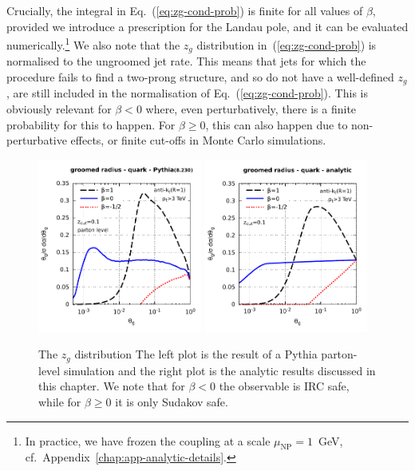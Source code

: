 %
Crucially, the integral in Eq.~(\ref{eq:zg-cond-prob}) is finite for
all values of $\beta$, provided we introduce a prescription for the
Landau pole, and it can be evaluated numerically.\footnote{In
  practice, we have frozen the coupling at a scale
  $\mu_\text{NP}=1$~GeV, cf.\
  Appendix~\ref{chap:app-analytic-details}.}
%
We also note that the $z_g$ distribution in~(\ref{eq:zg-cond-prob}) is
normalised to the ungroomed jet rate. This means that jets for which
the \SD procedure fails to find a two-prong structure, and so do not
have a well-defined $z_g$, are still included in the normalisation of
Eq.~(\ref{eq:zg-cond-prob}). This is obviously relevant for $\beta<0$
where, even perturbatively, there is a finite probability for this to
happen. For $\beta\ge 0$, this can also happen \eg due to
non-perturbative effects, or finite cut-offs in Monte Carlo
simulations.

\begin{figure}[t!]
  \centering
  \includegraphics[width=0.48\textwidth,page=2]{figures/zgthetag-pythia.pdf}%
  \hfill%
  \includegraphics[width=0.48\textwidth,page=2]{figures/zgthetag-analytic.pdf}%
  \caption{The $z_g$ distribution The left plot is the result of a Pythia parton-level
    simulation and the right plot is the analytic results discussed in
    this chapter. We note that for $\beta<0$ the observable is IRC safe, while for $\beta\ge 0$ it is only Sudakov safe.}\label{fig:zg-pythia-v-analytic}
\end{figure}

